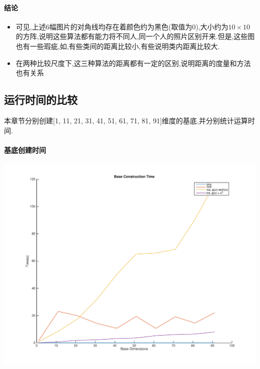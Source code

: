 \paragraph{结论}
\begin{itemize}
	\item 可见,上述6幅图片的对角线均存在着颜色约为黑色(取值为0),大小约为$10 \times 10$的方阵,说明这些算法都有能力将不同人,同一个人的照片区别开来.但是,这些图也有一些瑕疵,如,有些类间的距离比较小,有些说明类内距离比较大.
	\item 在两种比较尺度下,这三种算法的距离都有一定的区别,说明距离的度量和方法也有关系
\end{itemize}

\subsection{运行时间的比较}
\label{sec:pni_cal_time}
本章节分别创建[1, 11, 21, 31, 41, 51, 61, 71, 81, 91]维度的基底,并分别统计运算时间.
\paragraph{基底创建时间}
\begin{center}
\begin{minipage}[t]{\linewidth}
\center
{
\includegraphics[width=\MyFactor\textwidth]{Img/pni_baseconstr} 
\label{fig:ica_base}
}
\end{minipage}
\medskip
\end{center}

